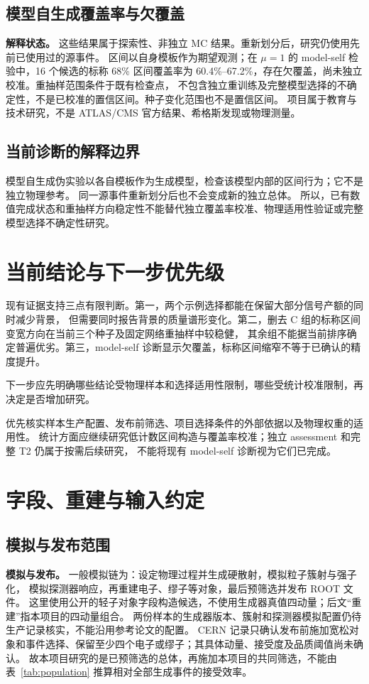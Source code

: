 \documentclass[11pt,a4paper,fontset=fandol,scheme=plain]{ctexart}
\begin{document}
\subsection{模型自生成覆盖率与欠覆盖}
\textbf{解释状态。} 这些结果属于探索性、非独立 MC 结果。重新划分后，研究仍使用先前已使用过的源事件。
区间以自身模板作为期望观测；在 $\mu=1$ 的 model-self 检验中，16 个候选的标称 68\% 区间覆盖率为
60.4\%--67.2\%，存在欠覆盖，尚未独立校准。重抽样范围条件于既有检查点，
不包含独立重训练及完整模型选择的不确定性，不是已校准的置信区间。种子变化范围也不是置信区间。
项目属于教育与技术研究，不是 ATLAS/CMS 官方结果、希格斯发现或物理测量。
\subsection{当前诊断的解释边界}

模型自生成伪实验以各自模板作为生成模型，检查该模型内部的区间行为；它不是独立物理参考。
同一源事件重新划分后也不会变成新的独立总体。
所以，已有数值完成状态和重抽样方向稳定性不能替代独立覆盖率校准、物理适用性验证或完整模型选择不确定性研究。

\section{当前结论与下一步优先级}

现有证据支持三点有限判断。第一，两个示例选择都能在保留大部分信号产额的同时减少背景，
但需要同时报告背景的质量谱形变化。第二，删去 C 组的标称区间变宽方向在当前三个种子及固定网络重抽样中较稳健，
其余组不能据当前排序确定普遍优劣。第三，model-self 诊断显示欠覆盖，标称区间缩窄不等于已确认的精度提升。

下一步应先明确哪些结论受物理样本和选择适用性限制，哪些受统计校准限制，再决定是否增加研究。

优先核实样本生产配置、发布前筛选、项目选择条件的外部依据以及物理权重的适用性。
统计方面应继续研究低计数区间构造与覆盖率校准；独立 assessment 和完整 T2 仍属于按需后续研究，
不能将现有 model-self 诊断视为它们已完成。

\clearpage
\appendix

\section{字段、重建与输入约定}\label{app:fields}

\subsection{模拟与发布范围}
\textbf{模拟与发布。} 一般模拟链为：设定物理过程并生成硬散射，模拟粒子簇射与强子化，
模拟探测器响应，再重建电子、缪子等对象，最后预筛选并发布 ROOT 文件。
这里使用公开的轻子对象字段构造候选，不使用生成器真值四动量；后文“重建”指本项目的四动量组合。
两份样本的生成器版本、簇射和探测器模拟配置仍待生产记录核实，不能沿用参考论文的配置。
CERN 记录只确认发布前施加宽松对象和事件选择、保留至少四个电子或缪子；其具体动量、接受度及品质阈值尚未确认。
故本项目研究的是已预筛选的总体，再施加本项目的共同筛选，不能由表~\ref{tab:population} 推算相对全部生成事件的接受效率。
\end{document}

